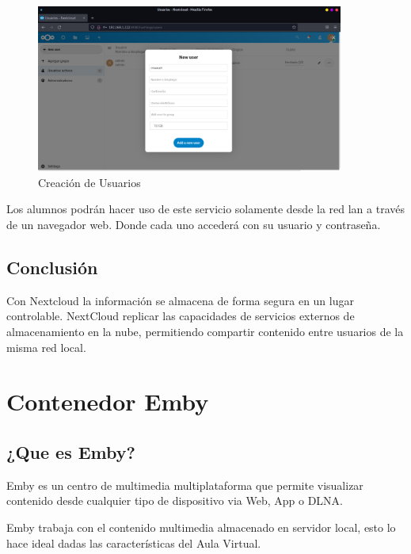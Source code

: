 			\begin{figure}[ht]
				
				\centering
				
				\includegraphics[width=0.9\textwidth]{imagenes/docker/nextcloud/creacionUsuarios.png}
				
				\caption{Creación de Usuarios}
				
				\label{fig:usuarios}
			\end{figure}	
		
		Los alumnos podrán hacer uso de este servicio solamente desde la red lan a través de un navegador web. Donde cada uno accederá con su usuario y contraseña.\par
		
		\subsection{Conclusión}
			
			Con Nextcloud la información se almacena de forma segura en un lugar controlable. NextCloud replicar las capacidades de servicios externos de almacenamiento en la nube, permitiendo compartir contenido entre usuarios de la misma red local.

	\section{Contenedor Emby}
	
		\subsection{¿Que es Emby?}
		
			Emby es un centro de multimedia multiplataforma que permite visualizar contenido desde cualquier tipo de dispositivo via Web, App o DLNA. 
		
			Emby trabaja con el contenido multimedia almacenado en servidor local, esto lo hace ideal dadas las características del Aula Virtual.\par
			
